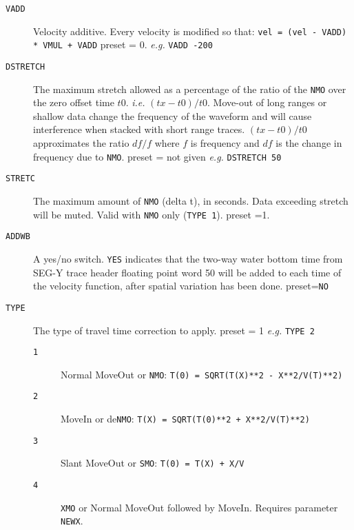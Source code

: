 \begin{description}
\item[\texttt{VADD}] Velocity additive.  Every velocity is modified so that:
         \texttt{vel = (vel - VADD) * VMUL + VADD}
         \Gls{preset} = 0.    \textit{e.g.}  \texttt{VADD -200}

\item[\texttt{DSTRETCH}] The maximum stretch allowed as a percentage of the ratio
         of the \texttt{NMO} over the zero offset time $t0$.  \textit{i.e.} $(tx-t0)/t0$.
         Move-out of long ranges or shallow data change the frequency
         of the waveform and will cause interference when stacked with
         short range traces.  $(tx-t0)/t0$ approximates the ratio $df/f$
         where $f$ is frequency and $df$ is the change in frequency due
         to \texttt{NMO}.
         \Gls{preset} = not given    \textit{e.g.} \texttt{DSTRETCH 50}

\item[\texttt{STRETC}] The maximum amount of \texttt{NMO} (delta t), in seconds.  Data
         exceeding stretch will be muted.  Valid with \texttt{NMO} only (\texttt{TYPE 1}).
         \Gls{preset} =1.

\item[\texttt{ADDWB}] A yes/no switch.  \texttt{YES} indicates that the two-way water bottom
         time from SEG-Y trace header floating point word 50 will
         be added to each time of the velocity function, after spatial
         variation has been done.
         \Gls{preset}=\texttt{NO}

\item[\texttt{TYPE}] The type of travel time correction to apply.  \Gls{preset} = 1     \textit{e.g.} \texttt{TYPE 2}
\begin{description}
\item[\texttt{1}]  Normal MoveOut or \texttt{NMO}: \texttt{T(0) = SQRT(T(X)**2 - X**2/V(T)**2)}
\item[\texttt{2}]  MoveIn or de\texttt{NMO}: \texttt{T(X) = SQRT(T(0)**2 + X**2/V(T)**2)}
\item[\texttt{3}]  Slant MoveOut or \texttt{SMO}:  \texttt{T(0) = T(X) + X/V}
\item[\texttt{4}]  \texttt{XMO} or Normal MoveOut followed by MoveIn.  Requires parameter \texttt{NEWX}.
\end{description}


\end{description}
